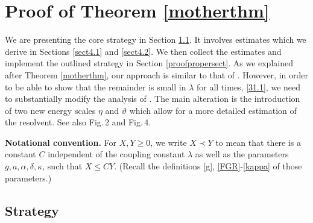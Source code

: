 \documentclass[letterpaper,onecolumn,11pt,accepted=2021-12-09]{quantumarticle}
\numberwithin{equation}{section}
\begin{document}
\section{Proof of Theorem \ref{motherthm}}
\label{proofsect}



We are presenting the core strategy in Section \ref{sect4.0}. It involves estimates which we derive in Sections \ref{sect4.1} and \ref{sect4.2}. We then collect the estimates and implement the outlined strategy in Section \ref{proofpropersect}. As we explained after Theorem \ref{motherthm}, our approach is similar to that of \cite{KM1}. However, in order to be able to show that the remainder is small in $\lambda$ for all times, \eqref{31.1}, we need to substantially modify the analysis of \cite{KM1}. The main alteration is the introduction of two new energy scales $\eta$ and $\vartheta$ which allow for a more detailed estimation of the resolvent. See also Fig.\,2 and Fig.\,4.
\medskip



{\bf Notational convention. }  For $X,Y\ge 0$, we write  $X\prec Y$ to mean that there is a constant $C$ independent of the coupling constant $\lambda$ as well as the parameters  $g, a,\alpha,\delta,\kappa$,  such that $X\le C Y$. (Recall the definitions \eqref{g}, \eqref{FGR}-\eqref{kappa} of those parameters.)





\subsection{Strategy}
\label{sect4.0}
\end{document}
